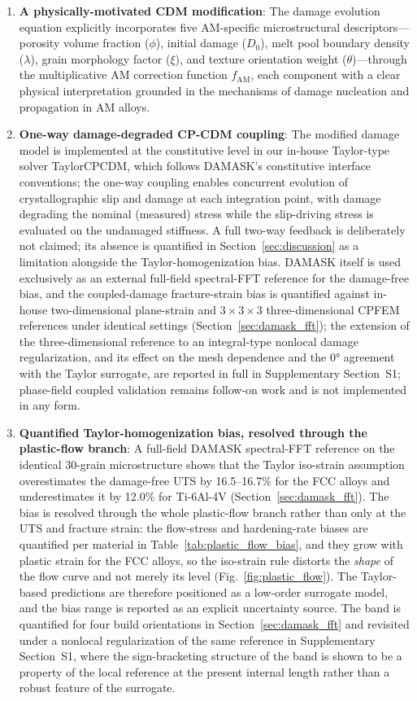 \documentclass[twocolumn]{sagej}
\begin{document}
\begin{enumerate}
    \item \textbf{A physically-motivated CDM modification}: The damage evolution equation explicitly incorporates five AM-specific microstructural descriptors---porosity volume fraction ($\phi$), initial damage ($D_0$), melt pool boundary density ($\lambda$), grain morphology factor ($\xi$), and texture orientation weight ($\theta$)---through the multiplicative AM correction function $f_{\text{AM}}$, each component with a clear physical interpretation grounded in the mechanisms of damage nucleation and propagation in AM alloys.
    
    \item \textbf{One-way damage-degraded CP-CDM coupling}: The modified damage model is implemented at the constitutive level in our in-house Taylor-type solver TaylorCPCDM, which follows DAMASK's constitutive interface conventions; the one-way coupling enables concurrent evolution of crystallographic slip and damage at each integration point, with damage degrading the nominal (measured) stress while the slip-driving stress is evaluated on the undamaged stiffness. A full two-way feedback is deliberately not claimed; its absence is quantified in Section~\ref{sec:discussion} as a limitation alongside the Taylor-homogenization bias. DAMASK itself is used exclusively as an external full-field spectral-FFT reference for the damage-free bias, and the coupled-damage fracture-strain bias is quantified against in-house two-dimensional plane-strain and $3\times3\times3$ three-dimensional CPFEM references under identical settings (Section~\ref{sec:damask_fft}); the extension of the three-dimensional reference to an integral-type nonlocal damage regularization, and its effect on the mesh dependence and the $\ang{0}$ agreement with the Taylor surrogate, are reported in full in Supplementary Section~S1; phase-field coupled validation remains follow-on work and is not implemented in any form.
    
    \item \textbf{Quantified Taylor-homogenization bias, resolved through the plastic-flow branch}: A full-field DAMASK spectral-FFT reference on the identical 30-grain microstructure shows that the Taylor iso-strain assumption overestimates the damage-free UTS by 16.5--16.7\% for the FCC alloys and underestimates it by 12.0\% for Ti-6Al-4V (Section~\ref{sec:damask_fft}). The bias is resolved through the whole plastic-flow branch rather than only at the UTS and fracture strain: the flow-stress and hardening-rate biases are quantified per material in Table~\ref{tab:plastic_flow_bias}, and they grow with plastic strain for the FCC alloys, so the iso-strain rule distorts the \emph{shape} of the flow curve and not merely its level (Fig.~\ref{fig:plastic_flow}). The Taylor-based predictions are therefore positioned as a low-order surrogate model, and the bias range is reported as an explicit uncertainty source. The band is quantified for four build orientations in Section~\ref{sec:damask_fft} and revisited under a nonlocal regularization of the same reference in Supplementary Section~S1, where the sign-bracketing structure of the band is shown to be a property of the local reference at the present internal length rather than a robust feature of the surrogate.
    

\end{enumerate}
\end{document}
